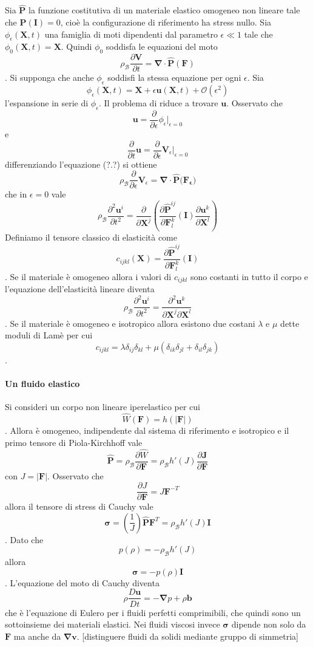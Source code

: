 \documentclass{book}
\newcommand{\Nabla}{\boldsymbol{\nabla}}
\begin{document}
Sia $\widehat{\mathbf{P}}$ la funzione costitutiva di un materiale elastico omogeneo non lineare tale che $\widehat{\mathbf{P}}(\mathbf{I})=0$, cioè la configurazione di riferimento ha stress nullo.
Sia $\phi_\epsilon(\mathbf{X},t)$ una famiglia di moti dipendenti dal parametro $\epsilon \ll1$ tale che $\phi_0(\mathbf{X},t) = \mathbf{X}$. Quindi $\phi_0$ soddisfa le equazioni del moto
$$\rho_\mathcal{B}\frac{\partial \mathbf{V}}{\partial t} = \Nabla\cdot\widehat{\mathbf{P}}(\mathbf{F}) $$.
Si supponga che anche $\phi_\epsilon$ soddisfi la stessa equazione per ogni $\epsilon$.
Sia 
$$\phi_\epsilon(\mathbf{X},t) = \mathbf{X}+\epsilon\mathbf{u}(\mathbf{X},t) + \mathcal{O}(\epsilon^2)$$
l'espansione in serie di $\phi_\epsilon$.
Il problema di riduce a trovare $\mathbf{u}$.
Osservato che 
$$\mathbf{u}=\frac{\partial}{\partial \epsilon}\phi_\epsilon \big|_{\epsilon=0}$$
e
$$\frac{\partial}{\partial t}\mathbf{u}=\frac{\partial}{\partial \epsilon}\mathbf{V}_\epsilon \big|_{\epsilon=0}$$
differenziando l'equazione (?.?) si ottiene
$$\rho_{\mathcal{B}} \frac{\partial}{\partial \epsilon}\mathbf{V}_\epsilon = \Nabla\cdot\widehat{\mathbf{P}}(\mathbf{F_\epsilon)}$$
che in $\epsilon=0$ vale
$$\rho_{\mathcal{B}} \frac{\partial^2\mathbf{u}^i}{\partial t^2} = \frac{\partial}{\partial \mathbf{X}^j}(\frac{\partial\widehat{\mathbf{P}}^{ij}}{\partial\mathbf{F}^k_l}(\mathbf{I})\frac{\partial\mathbf{u}^k}{\partial\mathbf{X}^l})$$
Definiamo il tensore classico di elasticità come
$$ c_{ijkl}(\mathbf{X})= \frac{\partial\widehat{\mathbf{P}}^{ij}}{\partial\mathbf{F}^k_l}(\mathbf{I})$$.
Se il materiale è omogeneo allora i valori di $c_{ijkl}$ sono costanti in tutto il corpo e l'equazione dell'elasticità lineare diventa
$$\rho_{\mathcal{B}} \frac{\partial^2\mathbf{u}^i}{\partial t^2} = \frac{\partial^2\mathbf{u}^k}{\partial\mathbf{X}^j\partial\mathbf{X}^l}$$.
Se il materiale è omogeneo e isotropico allora esistono due costani $\lambda$ e $\mu$ dette moduli di Lamè per cui
$$c_{ijkl}=\lambda\delta_{ij}\delta_{kl}+\mu(\delta_{ik}\delta_{jl}+\delta_{il}\delta_{jk})$$.
\paragraph{Un fluido elastico}
Si consideri un corpo non lineare iperelastico per cui
$$\widehat{W}(\mathbf{F}) = h(|\mathbf{F}|)$$.
Allora è omogeneo, indipendente dal sistema di riferimento e isotropico e il primo tensore di Piola-Kirchhoff vale
$$\widehat{\mathbf{P}}=\rho_{\mathcal{B}}\frac{\partial \widehat{W}}{\partial \mathbf{F}} = \rho_{\mathcal{B}}h'(J)\frac{\partial \mathbf{J}}{\partial \mathbf{F}}$$
con $J = |\mathbf{F}|$.
Osservato che 
$$\frac{\partial J}{\partial \mathbf{F}} = J\mathbf{F}^{-T}$$
allora il tensore di stress di Cauchy vale
$$\boldsymbol{\sigma}=(\frac{1}{J})\widehat{\mathbf{P}}\mathbf{F}^{T}=\rho_{\mathcal{B}}h'(J)\mathbf{I}$$.
Dato che
$$p(\rho)=-\rho_{\mathcal{B}}h'(J)$$
allora
$$\boldsymbol{\sigma}=-p(\rho)\mathbf{I}$$.
L'equazione del moto di Cauchy diventa
$$\rho\frac{D \mathbf{u}}{Dt} = -\Nabla p+\rho\mathbf{b}$$
che è l'equazione di Eulero per i fluidi perfetti comprimibili, che quindi sono un sottoinsieme dei materiali elastici.
Nei fluidi viscosi invece $\boldsymbol{\sigma}$ dipende non solo da $\mathbf{F}$ ma anche da $\Nabla\mathbf{v}$.
[distinguere fluidi da solidi mediante gruppo di simmetria]
\end{document}

